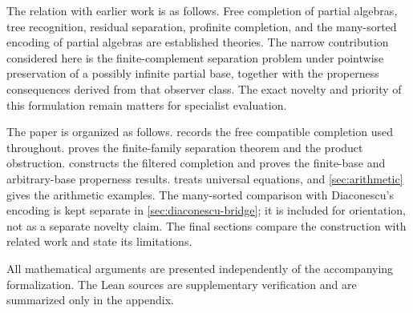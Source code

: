 The relation with earlier work is as follows.  Free completion of partial
algebras, tree recognition, residual separation, profinite completion, and the
many-sorted encoding of partial algebras are established theories.  The narrow
contribution considered here is the finite-complement separation problem under
pointwise preservation of a possibly infinite partial base, together with the
properness consequences derived from that observer class.  The exact novelty
and priority of this formulation remain matters for specialist evaluation.

The paper is organized as follows.   records the free
compatible completion used throughout.   proves the
finite-family separation theorem and the product obstruction.
 constructs the filtered completion and proves the
finite-base and arbitrary-base properness results.   treats
universal equations, and \cref{sec:arithmetic} gives the arithmetic examples.
The many-sorted comparison with Diaconescu's encoding is kept separate in
\cref{sec:diaconescu-bridge}; it is included for orientation, not as a separate
novelty claim.  The final sections compare the construction with related work
and state its limitations.

All mathematical arguments are presented independently of the accompanying
formalization.  The Lean sources are supplementary verification and are
summarized only in the appendix.
